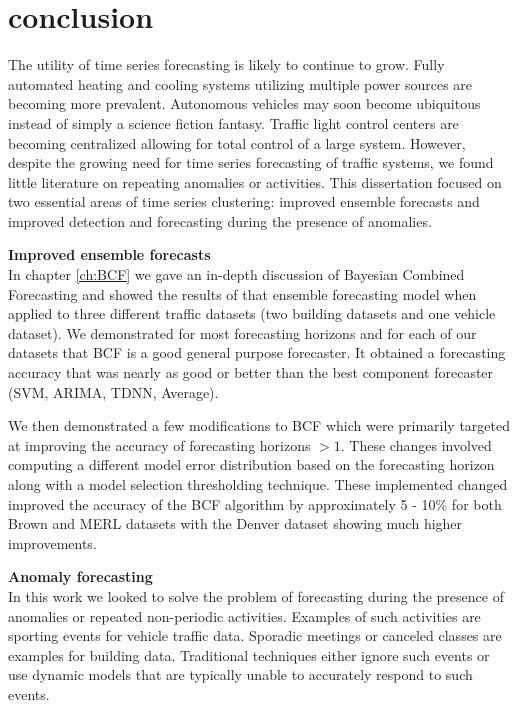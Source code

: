 \chapter{conclusion}

The utility of time series forecasting is likely to continue to grow.  Fully automated heating and cooling systems utilizing multiple power sources are becoming more prevalent.  Autonomous vehicles may soon become ubiquitous instead of simply a science fiction fantasy.  Traffic light control centers are becoming centralized allowing for total control of a large system.  However, despite the growing need for time series forecasting of traffic systems, we found little literature on repeating anomalies or activities.  This dissertation focused on two essential areas of time series clustering: improved ensemble forecasts and improved detection and forecasting during the presence of anomalies.  

\bigskip
\noindent \textbf{Improved ensemble forecasts}\\
In chapter \ref{ch:BCF} we gave an in-depth discussion of Bayesian Combined Forecasting and showed the results of that ensemble forecasting model when applied to three different traffic datasets (two building datasets and one vehicle dataset).  We demonstrated for most forecasting horizons and for each of our datasets that BCF is a good general purpose forecaster.  It obtained a forecasting accuracy that was nearly as good or better than the best component forecaster (SVM, ARIMA, TDNN, Average).  

We then demonstrated a few modifications to BCF which were primarily targeted at improving the accuracy of forecasting horizons $ > 1$.  These changes involved computing a different model error distribution based on the forecasting horizon along with a model selection thresholding technique.  These implemented changed improved the accuracy of the BCF algorithm by approximately 5 - 10\% for both Brown and MERL datasets with the Denver dataset showing much higher improvements.  

 \bigskip
\noindent \textbf{Anomaly forecasting}\\
In this work we looked to solve the problem of forecasting during the presence of anomalies or repeated non-periodic activities.  Examples of such activities are sporting events for vehicle traffic data.  Sporadic meetings or canceled classes are examples for building data.  Traditional techniques either ignore such events or use dynamic models that are typically unable to accurately respond to such events.  

